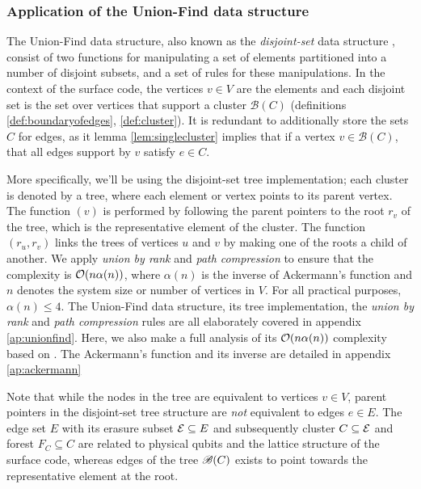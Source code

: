 \subsubsection{Application of the Union-Find data structure}

The Union-Find data structure, also known as the \emph{disjoint-set} data structure \cite{tarjan1975efficiency}, consist of two functions for manipulating a set of elements partitioned into a number of disjoint subsets, and a set of rules for these manipulations. In the context of the surface code, the vertices $v\in V$ are the elements and each disjoint set is the set over vertices that support a cluster $\mathscr{B}(C)$ (definitions \ref{def:boundaryofedges}, \ref{def:cluster}). It is redundant to additionally store the sets $C$ for edges, as it lemma \ref{lem:singlecluster} implies that if a vertex $v\in \mathscr{B}(C)$, that all edges support by $v$ satisfy $e \in C$. 

More specifically, we'll be using the disjoint-set tree implementation; each cluster is denoted by a tree, where each element or vertex points to its parent vertex. The function $(v)$ is performed by following the parent pointers to the root $r_v$ of the tree, which is the representative element of the cluster. The function $(r_u,r_v)$ links the trees of vertices $u$ and $v$ by making one of the roots a child of another. We apply \emph{union by rank} and \emph{path compression} to ensure that the complexity is $\mathcal{O}(n\alpha(n))$, where $\alpha(n)$ is the inverse of Ackermann's function and $n$ denotes the system size or number of vertices in $V$. For all practical purposes, $\alpha(n)\leq 4$. The Union-Find data structure, its tree implementation, the \emph{union by rank} and \emph{path compression} rules are all elaborately covered in appendix \ref{ap:unionfind}. Here, we also make a full analysis of its $\mathcal{O}(n\alpha(n))$ complexity based on \cite{kozen1992design}. The Ackermann's function and its inverse are detailed in appendix \ref{ap:ackermann}

Note that while the nodes in the tree are equivalent to vertices $v \in V$, parent pointers in the disjoint-set tree structure are \emph{not} equivalent to edges $e\in E$. The edge set $E$ with its erasure subset $\mathcal{E}\subseteq E$ and subsequently cluster $C\subseteq \mathcal{E}$ and forest $F_C\subseteq C$ are related to physical qubits and the lattice structure of the surface code, whereas edges of the tree $\mathscr{B}(C)$ exists to point towards the representative element at the root.


